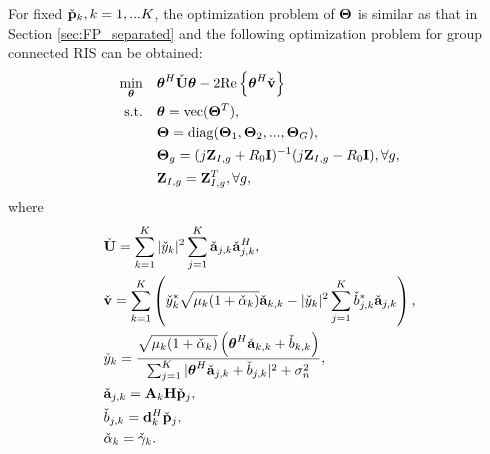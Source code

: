 For fixed $\check{\bf p}_k, k=1,...K$, the optimization problem of ${\bf \Theta}$ is similar as that in Section \ref{sec:FP_separated} and the
following optimization problem for group connected RIS can be obtained:
\begin{subequations} \label{problem:shared_theta}
    \begin{align}
        \min_{\boldsymbol{\theta}} \quad & \boldsymbol{\theta}^H \check{\bf U} \boldsymbol{\theta} - 2 \mathrm{Re} \left\{ \boldsymbol{\theta}^H \check{\bf v} \right\}\\  
        \mathrm{s.t.} \quad &  \boldsymbol{\theta} = \mathrm{vec}({\bf \Theta}^T),
        \\ &{\bf \Theta} = \mathrm{diag}({\bf \Theta}_1,{\bf \Theta}_2,...,{\bf \Theta}_G), 
        \\ &{\bf \Theta}_g = (j{\bf Z}_{I,g} + R_0 {\bf I})^{-1}(j{\bf Z}_{I,g} - R_0 {\bf I}), \forall g, 
        \\ &{\bf Z}_{I,g}={\bf Z}_{I,g}^T, \forall g,
    \end{align}
\end{subequations}
where 
\begin{align}
    &\check{\bf U} = \sum_{k=1}^K |\check{y}_k|^2  \sum_{j=1}^K \check{\bf a}_{j,k} \check{\bf a}_{j,k}^H, \\
    &\check{\bf v} = \sum_{k=1}^K \left( \check{y}_k^* \sqrt{\mu_k(1+\check{\alpha}_k)} \check{\bf a}_{k,k} - |\check{y}_k|^2 \sum_{j=1}^K \check{b}_{j,k}^* \check{\bf a}_{j,k} \right),\\
    \label{eqn:shared_optimal_y}
    &\check{y}_k = \frac{\sqrt{\mu_k (1+\check{\alpha}_k)} \left(\boldsymbol{\theta}^H \check{\bf a}_{k,k} + \check{b}_{k,k} \right)}{\sum_{j=1}^K |\boldsymbol{\theta}^H \check{\bf a}_{j,k} + \check{b}_{j,k}|^2  + \sigma_n^2}, \\
    &\check{\bf a}_{j,k}={\bf A}_k \mathbf{H} \check{\bf p}_j,\\
    &\check{b}_{j,k} = {\bf d}_k^H \check{\bf p}_j,\\
    \label{eqn:shared_optimal_alpha}
    &\check{\alpha}_k = \check{\gamma}_k.
\end{align}


